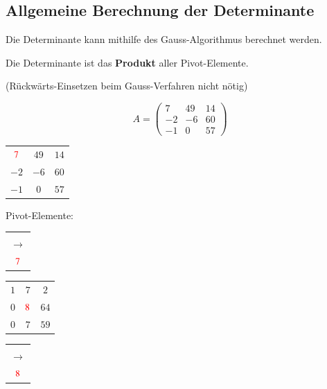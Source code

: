 \subsection{Allgemeine Berechnung der Determinante}

Die Determinante kann mithilfe des Gauss-Algorithmus berechnet werden.

Die Determinante ist das \textbf{Produkt} aller Pivot-Elemente.

(Rückwärts-Einsetzen beim Gauss-Verfahren nicht nötig)

$$A =
\begin{pmatrix}
	7 & 49 & 14 \\
	-2 & -6 & 60 \\
	-1 & 0 & 57 
\end{pmatrix}$$

\begin{minipage}[t]{0.1\columnwidth}
\end{minipage}
\begin{minipage}[t]{0.21\columnwidth}
\centering
\renewcommand{\arraystretch}{1.4}
	\begin{tabular}{|c c c|}
		\hline
		${\color{red}7}$  & $49$ & $14$ \\
		$-2$ & $-6$ & $60$ \\
		$-1$ & $0$  & $57$ \\
		\hline
	\end{tabular}
\smallskip
Pivot-Elemente:
\end{minipage}
\begin{minipage}[t]{0.05\columnwidth}
\centering
	\begin{tabular}{c}
		\\\\
		$\rightarrow$\\[1.8em]
		${\color{red}7}$
	\end{tabular}
\end{minipage}
\begin{minipage}[t]{0.175\columnwidth}
\centering
\renewcommand{\arraystretch}{1.4}
	\begin{tabular}{|c c c|}
		\hline
		$1$ & $7$ & $2$ \\
		$0$ & ${\color{red}8}$ & $64$ \\
		$0$ & $7$ & $59$ \\
		\hline
	\end{tabular}
\end{minipage}
\begin{minipage}[t]{0.05\columnwidth}
\centering
	\begin{tabular}{c}
		\\\\
		$\rightarrow$\\[1.8em]
		${\color{red}8}$
	\end{tabular}
\end{minipage}
